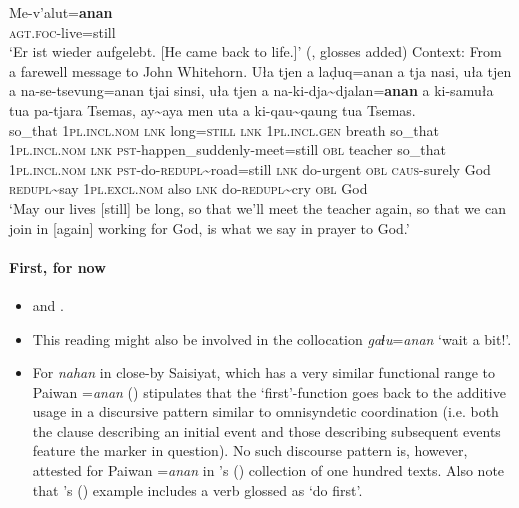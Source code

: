 \begin{exe}
	\ex\label{appendixPaiwanRestitutive1}
	\gll Me-v’alut=\textbf{anan}\\
	\textsc{agt}.\textsc{foc}-live=still\\
	\glt \lq Er ist wieder aufgelebt. [He came back to life.]\rq{ }(\cite[29]{Egli2002}, glosses added)
	\pagebreak
	\ex\label{appendixPaiwanRestitutive2}
			 Context: From a farewell message to John Whitehorn.
	\exi{}\gll Uła tjen a laḍuq=anan a tja nasi, uła tjen a na-se-tsevung=anan tjai sinsi, uła tjen a na-ki-dja\sim{}djalan=\textbf{anan} a ki-samuła tua pa-tjara Tsemas, ay\sim{}aya men uta a ki-qau\sim{}qaung tua Tsemas.\\
	so\_that 1\textsc{pl}.\textsc{incl}.\textsc{nom} \textsc{lnk} long=\textsc{still} \textsc{lnk} 1\textsc{pl}.\textsc{incl}.\textsc{gen} breath so\_that 1\textsc{pl}.\textsc{incl}.\textsc{nom} \textsc{lnk} \textsc{pst}-happen\_suddenly-meet=still \textsc{obl} teacher so\_that 1\textsc{pl}.\textsc{incl}.\textsc{nom} \textsc{lnk} \textsc{pst}-do-\textsc{redupl}\sim{}road=still \textsc{lnk} do-urgent \textsc{obl} \textsc{caus}-surely God \textsc{redupl}\sim{}say 1\textsc{pl}.\textsc{excl}.\textsc{nom} also \textsc{lnk} do-\textsc{redupl}\sim{}cry \textsc{obl} God\\
	\glt \lq May our lives [still] be long, so that we’ll meet the teacher again, so that we can join in [again] working for God, is what we say in prayer to God.' \parencite[482–483]{EarlyWhitehorn2003}
\end{exe}


\paragraph{First, for now}
\label{appendixPaiwanFirst}
\begin{itemize}
	\item \textcite[228, 295]{Chang2006} and \textcite[164]{Egli1990}.
	\item This reading might also be involved in the collocation \mbox{\textit{gaɬu}=\textit{anan}} \lq wait a bit!'.
	\item For \textit{nahan} in close-by Saisiyat, which has a very similar functional range to Paiwan \mbox{=\textit{anan}} () \textcite{Huang2008} stipulates that the \lq first'-function goes back to the additive usage in a discursive pattern similar to omnisyndetic coordination (i.e. both the clause describing an initial event and those describing subsequent events feature the marker in question). No such discourse pattern is, however, attested for Paiwan \mbox{=\textit{anan}} in \citeauthor{EarlyWhitehorn2003}'s (\citeyear{EarlyWhitehorn2003}) collection of one hundred texts. Also note that \citeauthor{Huang2008}'s (\citeyear[116]{Huang2008}) example includes a verb glossed as \lq do first'.
\end{itemize}
\largerpage

